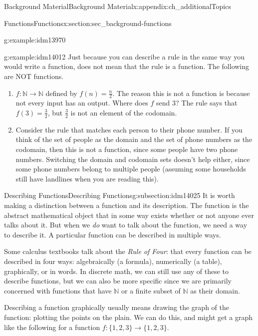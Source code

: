 \documentclass[oneside,10pt,]{book}
\numberwithin{equation}{chapter}
\def\N{\mathbb N}
\begin{document}
\begin{appendixptx}{Background Material}{}{Background Material}{}{}{x:appendix:ch_additionalTopics}
\begin{sectionptx}{Functions}{}{Functions}{}{}{x:section:sec_background-functions}
\begin{introduction}{}
\begin{example}{}{g:example:idm13970}
\begin{enumerate}
\end{enumerate}
%
\end{example}
\begin{example}{}{g:example:idm14012}%
Just because you can describe a rule in the same way you would write a function, does not mean that the rule is a function.  The following are NOT functions.%
\begin{enumerate}
\item{}\(f:\N \to \N\) defined by \(f(n) = \frac{n}{2}\).  The reason this is not a function is because not every input has an output.  Where does \(f\) send 3?  The rule says that \(f(3) = \frac{3}{2}\), but \(\frac{3}{2}\) is not an element of the codomain.%
\item{}Consider the rule that matches each person to their phone number.  If you think of the set of people as the domain and the set of phone numbers as the codomain, then this is not a function, since some people have two phone numbers.  Switching the domain and codomain sets doesn't help either, since some phone numbers belong to multiple people (assuming some households still have landlines when you are reading this).%
\end{enumerate}
%
\end{example}
\end{introduction}%
%
%
\typeout{************************************************}
\typeout{************************************************}
%
\begin{subsectionptx}{Describing Functions}{}{Describing Functions}{}{}{g:subsection:idm14025}
It is worth making a distinction between a function and its description.  The function is the abstract mathematical object that in some way exists whether or not anyone ever talks about it.  But when we \emph{do} want to talk about the function, we need a way to describe it.  A particular function can be described in multiple ways.%
\par
Some calculus textbooks talk about the \emph{Rule of Four}: that every function can be described in four ways: algebraically (a formula), numerically (a table), graphically, or in words.  In discrete math, we can still use any of these to describe functions, but we can also be more specific since we are primarily concerned with functions that have \(\N\) or a finite subset of \(\N\) as their domain.%
\par
Describing a function graphically usually means drawing the graph of the function: plotting the points on the plain. We can do this, and might get a graph like the following for a function \(f:\{1,2,3\} \to \{1,2,3\}\).%

\end{subsectionptx}
\end{sectionptx}
\end{appendixptx}
\end{document}
